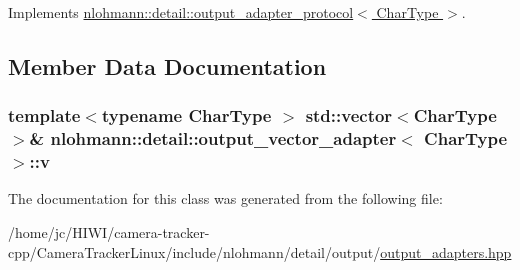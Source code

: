 Implements \hyperlink{structnlohmann_1_1detail_1_1output__adapter__protocol_a2f410a164e0eda17cf6561114b0eee4a}{nlohmann\+::detail\+::output\+\_\+adapter\+\_\+protocol$<$ Char\+Type $>$}.



\subsection{Member Data Documentation}
\subsubsection[{\texorpdfstring{v}{v}}]{\setlength{\rightskip}{0pt plus 5cm}template$<$typename Char\+Type $>$ std\+::vector$<$Char\+Type$>$\& {\bf nlohmann\+::detail\+::output\+\_\+vector\+\_\+adapter}$<$ Char\+Type $>$\+::v\hspace{0.3cm}{\ttfamily [private]}}\hypertarget{classnlohmann_1_1detail_1_1output__vector__adapter_a9b1ed9fba14e671ae1abb6692560ef3f}{}\label{classnlohmann_1_1detail_1_1output__vector__adapter_a9b1ed9fba14e671ae1abb6692560ef3f}


The documentation for this class was generated from the following file\+:\begin{DoxyCompactItemize}
\item 
/home/jc/\+H\+I\+W\+I/camera-\/tracker-\/cpp/\+Camera\+Tracker\+Linux/include/nlohmann/detail/output/\hyperlink{output__adapters_8hpp}{output\+\_\+adapters.\+hpp}\end{DoxyCompactItemize}
